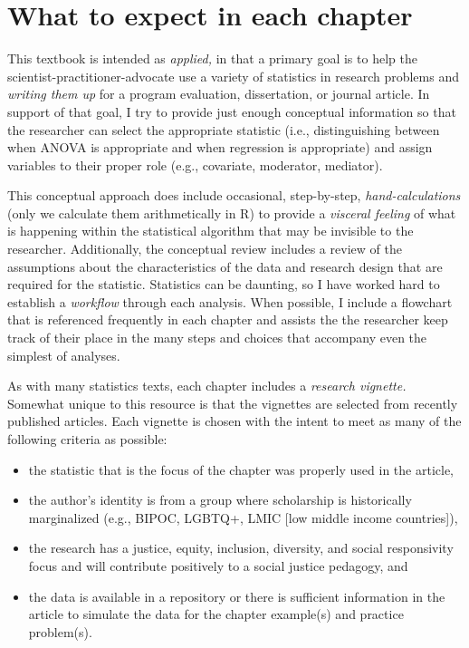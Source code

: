\documentclass[
  11pt,
]{book}
\providecommand{\tightlist}{%
  \setlength{\itemsep}{0pt}\setlength{\parskip}{0pt}}
\begin{document}
\hypertarget{what-to-expect-in-each-chapter}{%
\section{What to expect in each chapter}\label{what-to-expect-in-each-chapter}}

This textbook is intended as \emph{applied,} in that a primary goal is to help the scientist-practitioner-advocate use a variety of statistics in research problems and \emph{writing them up} for a program evaluation, dissertation, or journal article. In support of that goal, I try to provide just enough conceptual information so that the researcher can select the appropriate statistic (i.e., distinguishing between when ANOVA is appropriate and when regression is appropriate) and assign variables to their proper role (e.g., covariate, moderator, mediator).

This conceptual approach does include occasional, step-by-step, \emph{hand-calculations} (only we calculate them arithmetically in R) to provide a \emph{visceral feeling} of what is happening within the statistical algorithm that may be invisible to the researcher. Additionally, the conceptual review includes a review of the assumptions about the characteristics of the data and research design that are required for the statistic. Statistics can be daunting, so I have worked hard to establish a \emph{workflow} through each analysis. When possible, I include a flowchart that is referenced frequently in each chapter and assists the the researcher keep track of their place in the many steps and choices that accompany even the simplest of analyses.

As with many statistics texts, each chapter includes a \emph{research vignette.} Somewhat unique to this resource is that the vignettes are selected from recently published articles. Each vignette is chosen with the intent to meet as many of the following criteria as possible:

\begin{itemize}
\tightlist
\item
  the statistic that is the focus of the chapter was properly used in the article,
\item
  the author's identity is from a group where scholarship is historically marginalized (e.g., BIPOC, LGBTQ+, LMIC {[}low middle income countries{]}),
\item
  the research has a justice, equity, inclusion, diversity, and social responsivity focus and will contribute positively to a social justice pedagogy, and
\item
  the data is available in a repository or there is sufficient information in the article to simulate the data for the chapter example(s) and practice problem(s).
\end{itemize}
\end{document}
